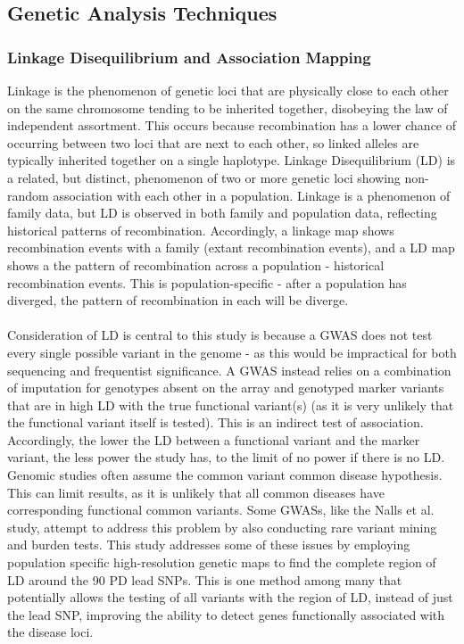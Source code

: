 \documentclass{article}
\begin{document}
\subsection{Genetic Analysis Techniques}
\subsubsection{Linkage Disequilibrium and Association Mapping}
\label{subsubsec:linkage}
Linkage is the phenomenon of genetic loci that are physically close to each other on the same chromosome tending to be inherited together, disobeying the law of independent assortment. This occurs because recombination has a lower chance of occurring between two loci that are next to each other, so linked alleles are typically inherited together on a single haplotype. Linkage Disequilibrium (LD) is a related, but distinct, phenomenon of two or more genetic loci showing non-random association with each other\cite{Slatkin2008LinkageFuture} in a population. Linkage is a phenomenon of family data, but LD is observed in both family and population data, reflecting historical patterns of recombination. Accordingly, a linkage map shows recombination events with a family (extant recombination events)\cite{Lynn2004VARIATIONRECOMBINATION}, and a LD map shows a the pattern of recombination across a population - historical recombination events. This is population-specific - after a population has diverged, the pattern of recombination in each will be diverge.
\\
\\Consideration of LD is central to this study is because a GWAS does not test every single possible variant in the genome - as this would be impractical for both sequencing and frequentist significance. A GWAS instead relies on a combination of imputation\cite{Dehghan2018Genome-WideStudies} for genotypes absent on the array and genotyped marker variants that are in high LD with the true functional variant(s) (as it is very unlikely that the functional variant itself is tested). This is an indirect test of association\cite{Weiss2000HowSNPs}. Accordingly, the lower the LD between a functional variant and the marker variant, the less power the study has, to the limit of no power if there is no LD. Genomic studies often assume the common variant common disease hypothesis. This can limit results, as it is unlikely that all common diseases have corresponding functional common variants\cite{Bodmer2008CommonDiseases}. Some GWASs, like the Nalls et al. study\cite{Nalls2019IdentificationStudies}, attempt to address this problem by also conducting rare variant mining and burden tests. This study addresses some of these issues by employing population specific high-resolution genetic maps\cite{Maniatis2004PositionalDisequilibrium.} to find the complete region of LD around the 90 PD lead SNPs. This is one method among many that potentially allows the testing of all variants with the region of LD, instead of just the lead SNP, improving the ability to detect genes functionally associated with the disease loci.
\end{document}
